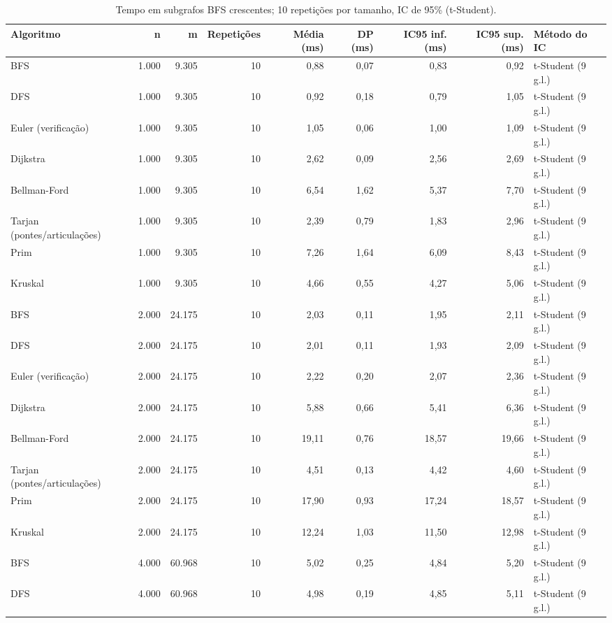 \begin{table}[ht]
\centering
\caption{Tempo em subgrafos BFS crescentes; 10 repetições por tamanho, IC de 95\% (t-Student).}
\label{tab:escala}
\small
\begin{tabular}{lrrrrrrrl}
\hline
Algoritmo & n & m & Repetições & Média (ms) & DP (ms) & IC95 inf. (ms) & IC95 sup. (ms) & Método do IC \\
\hline
BFS & 1.000 & 9.305 & 10 & 0,88 & 0,07 & 0,83 & 0,92 & t-Student (9 g.l.) \\
DFS & 1.000 & 9.305 & 10 & 0,92 & 0,18 & 0,79 & 1,05 & t-Student (9 g.l.) \\
Euler (verificação) & 1.000 & 9.305 & 10 & 1,05 & 0,06 & 1,00 & 1,09 & t-Student (9 g.l.) \\
Dijkstra & 1.000 & 9.305 & 10 & 2,62 & 0,09 & 2,56 & 2,69 & t-Student (9 g.l.) \\
Bellman-Ford & 1.000 & 9.305 & 10 & 6,54 & 1,62 & 5,37 & 7,70 & t-Student (9 g.l.) \\
Tarjan (pontes/articulações) & 1.000 & 9.305 & 10 & 2,39 & 0,79 & 1,83 & 2,96 & t-Student (9 g.l.) \\
Prim & 1.000 & 9.305 & 10 & 7,26 & 1,64 & 6,09 & 8,43 & t-Student (9 g.l.) \\
Kruskal & 1.000 & 9.305 & 10 & 4,66 & 0,55 & 4,27 & 5,06 & t-Student (9 g.l.) \\
BFS & 2.000 & 24.175 & 10 & 2,03 & 0,11 & 1,95 & 2,11 & t-Student (9 g.l.) \\
DFS & 2.000 & 24.175 & 10 & 2,01 & 0,11 & 1,93 & 2,09 & t-Student (9 g.l.) \\
Euler (verificação) & 2.000 & 24.175 & 10 & 2,22 & 0,20 & 2,07 & 2,36 & t-Student (9 g.l.) \\
Dijkstra & 2.000 & 24.175 & 10 & 5,88 & 0,66 & 5,41 & 6,36 & t-Student (9 g.l.) \\
Bellman-Ford & 2.000 & 24.175 & 10 & 19,11 & 0,76 & 18,57 & 19,66 & t-Student (9 g.l.) \\
Tarjan (pontes/articulações) & 2.000 & 24.175 & 10 & 4,51 & 0,13 & 4,42 & 4,60 & t-Student (9 g.l.) \\
Prim & 2.000 & 24.175 & 10 & 17,90 & 0,93 & 17,24 & 18,57 & t-Student (9 g.l.) \\
Kruskal & 2.000 & 24.175 & 10 & 12,24 & 1,03 & 11,50 & 12,98 & t-Student (9 g.l.) \\
BFS & 4.000 & 60.968 & 10 & 5,02 & 0,25 & 4,84 & 5,20 & t-Student (9 g.l.) \\
DFS & 4.000 & 60.968 & 10 & 4,98 & 0,19 & 4,85 & 5,11 & t-Student (9 g.l.) \\

\end{tabular}
\end{table}
